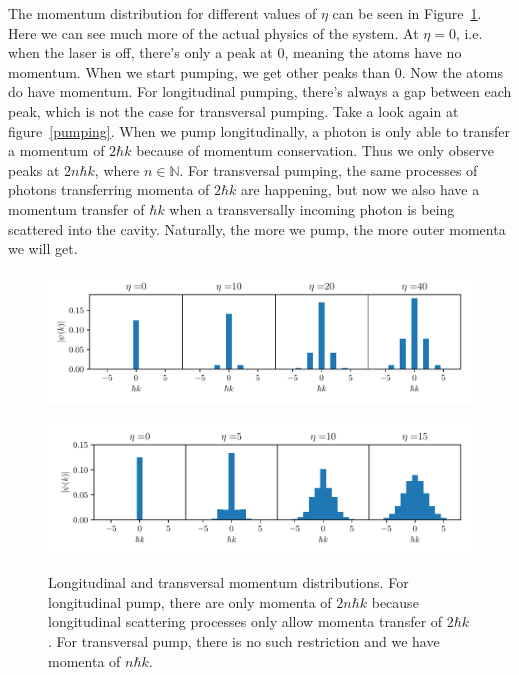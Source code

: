 \noindent The momentum distribution for different values of $\eta$ can be seen in Figure~\ref{momenta}. Here we can see much more of the actual physics of the system. At $\eta = 0$, i.e. when the laser is off, there's only a peak at 0, meaning the atoms have no momentum. When we start pumping, we get other peaks than 0. Now the atoms do have momentum. For longitudinal pumping, there's always a gap between each peak, which is not the case for transversal pumping. Take a look again at figure~\ref{pumping}. When we pump longitudinally, a photon is only able to transfer a momentum of $2 \hbar k$ because of momentum conservation. Thus we only observe peaks at $2n\hbar k$, where $n \in \mathbb{N}$. For transversal pumping, the same processes of photons transferring momenta of $2\hbar k$ are happening, but now we also have a momentum transfer of $\hbar k$ when a transversally incoming photon is being scattered into the cavity. Naturally, the more we pump, the more outer momenta we will get.

\begin{figure}[!htb]
	\begin{minipage}[b]{1\linewidth}
	\centering
	\includegraphics[width=1\textwidth]{images/mom_long.pdf}
	\label{long_momentum}
	\end{minipage}
%
	\begin{minipage}[b]{1\linewidth}
	\centering
	\includegraphics[width=1\textwidth]{images/mom_trans.pdf}
	\label{trans_momentum}
	\end{minipage}
\caption{Longitudinal and transversal momentum distributions. For longitudinal pump, there are only momenta of $2 n \hbar k$ because longitudinal scattering processes only allow momenta transfer of $2 \hbar k$. For transversal pump, there is no such restriction and we have momenta of $n \hbar k$.}
\label{momenta}
\end{figure}
\FloatBarrier


